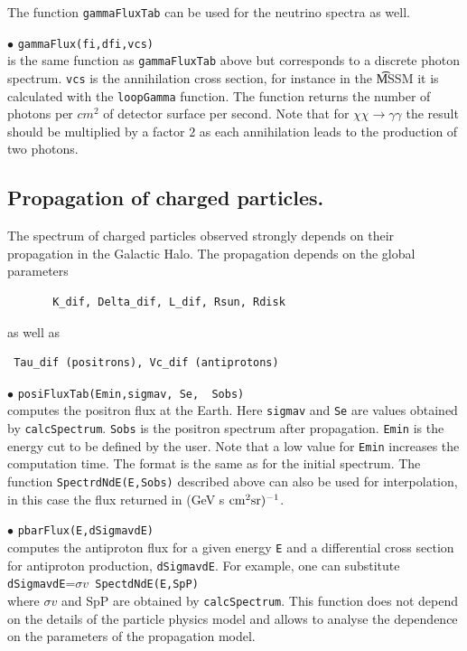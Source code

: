 \documentclass[12pt,a4paper]{article}
\begin{document}
The function \verb|gammaFluxTab| can be used  for the neutrino spectra as well.

\noindent
$\bullet$ \verb|gammaFlux(fi,dfi,vcs)|\\
is the same function as \verb|gammaFluxTab| above  but corresponds to  
a discrete photon spectrum. \verb|vcs| is the annihilation cross section, for instance in the {\t MSSM} it is 
calculated with the \verb|loopGamma| function. The function
returns the number of photons per $cm^2$ of detector surface
 per second. Note that for $\chi\chi \to \gamma\gamma$ the  
result should be multiplied by a factor $2$ as each annihilation leads to the 
production of two photons. 

\subsection{Propagation of charged particles.}

The spectrum of charged particles observed strongly depends on their propagation
in the Galactic Halo. The propagation depends on the global parameters 
\begin{verbatim}
       K_dif, Delta_dif, L_dif, Rsun, Rdisk
\end{verbatim}
as well as 
\begin{verbatim}
 Tau_dif (positrons), Vc_dif (antiprotons)
\end{verbatim}

\noindent  
$\bullet$ \verb|posiFluxTab(Emin,sigmav, Se,  Sobs)|\\
computes the positron flux at the Earth. Here \verb|sigmav| and \verb|Se| are values obtained by 
\verb|calcSpectrum|.  \verb|Sobs| is the positron spectrum after propagation. \verb|Emin| is the energy cut to be defined by the user. Note that
a low value for \verb|Emin| increases the computation time.
The  format is the same as for the initial spectrum. The function  
\verb|SpectrdNdE(E,Sobs)| described above can also be used for interpolation, in this case the flux
returned in (GeV s ${\rm cm}^2 {\rm sr})^{-1}$. 

\noindent
$\bullet$ \verb|pbarFlux(E,dSigmavdE)|\\
computes the antiproton flux for a given energy {\tt E} and a 
differential cross section for antiproton production, {\tt dSigmavdE}.
For example, one can substitute\\ {\tt dSigmavdE}=$\sigma v${\tt
SpectdNdE(E,SpP)} \\
where $ \sigma v$ and {SpP} are obtained by {\tt calcSpectrum}.
This function does not depend on the details of the particle physics  model and allows to analyse the dependence on the
parameters of the propagation model.
\end{document}
